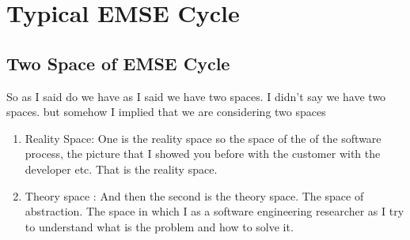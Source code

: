 \documentclass[conference, compsoc, twoside]{IEEEtran}
\begin{document}
\section{Typical EMSE Cycle} %

\subsection{Two Space of EMSE Cycle} %
 So as I said do we have as I said we have two spaces. I didn't say we have two spaces. but somehow I implied that we are considering two spaces 
 \begin{enumerate}
 	\item Reality Space: One is the reality space so the space of the of the software process, the picture that I showed you before with the customer with the developer etc. That is the reality space.
 	\item Theory space : And then the second is the theory space. The space of abstraction. The space in which I as a software engineering researcher as I try to understand what is the problem and how to solve it. 
 \end{enumerate}
\end{document}
